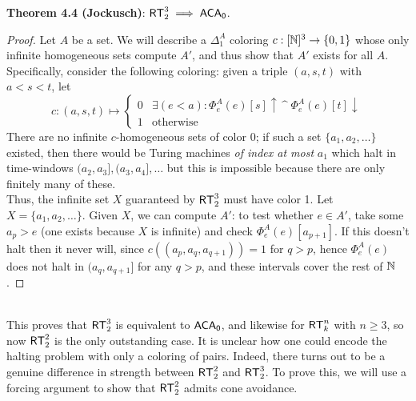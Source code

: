 \documentclass{amsart}
\begin{document}
	\noindent \textbf{Theorem 4.4 (Jockusch)}: $\operatorname{\sf{RT}}^3_2 \implies \operatorname{\sf{ACA_0}}$.
	\begin{proof}
		Let $A$ be a set. We will describe a $\Delta_1^A$ coloring $c:[\mathbb{N}]^3\to \{0,1\}$ whose only infinite homogeneous sets compute $A'$, and thus show that $A'$ exists for all $A$.\\
		\indent Specifically, consider the following coloring: given a triple $(a,s,t)$ with $a<s<t$, let 
		$$c:(a,s,t)\mapsto \begin{cases}
			0 & \exists (e<a) : \Phi^A_e(e)[s]\uparrow \, \^ \; \Phi^A_e(e)[t]\downarrow\\
			1 & \text{otherwise}
		\end{cases}$$ 
		There are no infinite $c$-homogeneous sets of color 0; if such a set $\{a_1,a_2,\dots\}$ existed, then there would be Turing machines \textit{of index at most} $a_1$ which halt in time-windows $(a_2,a_3],(a_3,a_4],\dots$ but this is impossible because there are only finitely many of these.\\
		\indent Thus, the infinite set $X$ guaranteed by $\operatorname{\sf{RT}}^3_2$ must have color 1. Let $X=\{a_1,a_2,\dots\}$. Given $X$, we can compute $A'$: to test whether $e\in A'$, take some $a_p>e$ (one exists because $X$ is infinite) and check $\Phi^A_e(e)[a_{p+1}]$. If this doesn't halt then it never will, since $c((a_p,a_q,a_{q+1}))=1$ for $q>p$, hence $\Phi^A_e(e)$ does not halt in $(a_q,a_{q+1}]$ for any $q>p$, and these intervals cover the rest of $\mathbb{N}$.
	\end{proof}\\
	
	This proves that $\operatorname{\sf{RT}}^3_2$ is equivalent to $\operatorname{\sf{ACA_0}}$, and likewise for $\operatorname{\sf{RT}}^n_k$ with $n\geq 3$, so now $\operatorname{\sf{RT}}^2_2$ is the only outstanding case. It is unclear how one could encode the halting problem with only a coloring of pairs. Indeed, there turns out to be a genuine difference in strength between $\operatorname{\sf{RT}}^2_2$ and $\operatorname{\sf{RT}}^3_2$. To prove this, we will use a forcing argument to show that $\operatorname{\sf{RT}}^2_2$ admits cone avoidance.\\ 
	
	\newpage 
	
\end{document}
